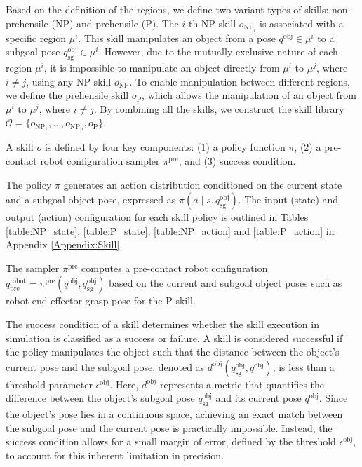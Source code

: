 Based on the definition of the regions, we define two variant types of skills: non-prehensile (NP) and prehensile (P). The \( i \)-th NP skill \( o_{\text{NP}_i} \) is associated with a specific region \( \mu^i \). This skill manipulates an object from a pose \( q^\text{obj} \in \mu^i \) to a subgoal pose \( q^\text{obj}_\text{sg} \in \mu^i \). However, due to the mutually exclusive nature of each region \( \mu^i \), it is impossible to manipulate an object directly from \( \mu^i \) to \( \mu^j \), where \( i \neq j \), using any NP skill \( o_{\text{NP}} \). To enable manipulation between different regions, we define the prehensile skill \( o_{\text{P}} \), which allows the manipulation of an object from \( \mu^i \) to \( \mu^j \), where \( i \neq j \). By combining all the skills, we construct the skill library \(\mathcal{O}=\{o_{\text{NP}_1},...,o_{\text{NP}_n},o_{\text{P}}\}\).

A skill $o$ is defined by four key components: (1) a policy function \( \pi \), (2) a pre-contact robot configuration sampler \( \pi^{\text{pre}} \), and (3) success condition. %

The policy \( \pi \) generates an action distribution conditioned on the current state and a subgoal object pose, expressed as \( \pi(a \mid s, q^{\text{obj}}_\text{sg}) \). The input (state) and output (action) configuration for each skill policy is outlined in Tables \ref{table:NP_state}, \ref{table:P_state}, \ref{table:NP_action} and \ref{table:P_action} in Appendix \ref{Appendix:Skill}.

The sampler $\pi^{\text{pre}}$ computes a pre-contact robot configuration $q^{\text{robot}}_{\text{pre}} = \pi^{\text{pre}}(q^{\text{obj}}, q^{\text{obj}}_{\text{sg}})$ based on the current and subgoal object poses such as robot end-effector grasp pose for the P skill.

The success condition of a skill determines whether the skill execution in simulation is classified as a success or failure. A skill is considered successful if the policy manipulates the object such that the distance between the object's current pose and the subgoal pose, denoted as \( d^\text{obj}(q^\text{obj}_\text{sg}, q^\text{obj}) \), is less than a threshold parameter \( \epsilon^\text{obj} \). Here, \( d^\text{obj} \) represents a metric that quantifies the difference between the object's subgoal pose \( q^\text{obj}_\text{sg} \) and its current pose \( q^\text{obj} \). Since the object's pose lies in a continuous space, achieving an exact match between the subgoal pose and the current pose is practically impossible. Instead, the success condition allows for a small margin of error, defined by the threshold \( \epsilon^\text{obj} \), to account for this inherent limitation in precision.

